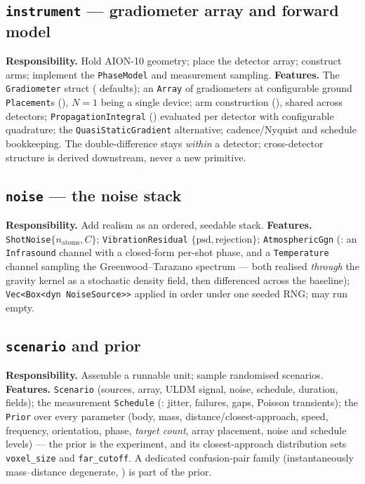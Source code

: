 \documentclass[11pt,a4paper]{article}
\theoremstyle{reqstyle}
\begin{document}
\subsection{\texttt{instrument} --- gradiometer array and forward model}
\textbf{Responsibility.} Hold AION-10 geometry; place the detector array; construct arms;
implement the \texttt{PhaseModel} and measurement sampling.
\textbf{Features.} The \texttt{Gradiometer} struct ( defaults); an
\texttt{Array} of gradiometers at configurable ground \texttt{Placement}s (),
$N{=}1$ being a single device; arm construction (), shared across detectors;
\texttt{PropagationIntegral} () evaluated per detector with configurable
quadrature; the \texttt{QuasiStaticGradient} alternative; cadence/Nyquist and schedule
bookkeeping. The double-difference stays \emph{within} a detector; cross-detector structure is
derived downstream, never a new primitive.

\subsection{\texttt{noise} --- the noise stack}
\textbf{Responsibility.} Add realism as an ordered, seedable stack.
\textbf{Features.} \texttt{ShotNoise}$\{n_{\text{atoms}},C\}$; \texttt{VibrationResidual}
$\{\text{psd},\text{rejection}\}$; \texttt{AtmosphericGgn} (: an
\texttt{Infrasound} channel with a closed-form per-shot phase, and a \texttt{Temperature}
channel sampling the Greenwood--Tarazano spectrum --- both realised \emph{through} the gravity
kernel as a stochastic density field, then differenced across the baseline);
\texttt{Vec<Box<dyn NoiseSource>>} applied in order under one seeded RNG; may run empty.

\subsection{\texttt{scenario} and prior}
\textbf{Responsibility.} Assemble a runnable unit; sample randomised scenarios.
\textbf{Features.} \texttt{Scenario} (sources, array, ULDM signal, noise, schedule, duration,
fields); the measurement \texttt{Schedule} (: jitter, failures, gaps,
Poisson transients); the \texttt{Prior} over every parameter (body, mass,
distance/closest-approach, speed, frequency, orientation, phase, \emph{target count}, array
placement, noise and schedule levels) --- the prior is the experiment, and its closest-approach
distribution sets \texttt{voxel\_size} and \texttt{far\_cutoff}. A dedicated confusion-pair
family (instantaneously mass--distance degenerate, ) is part of the prior.
\end{document}
